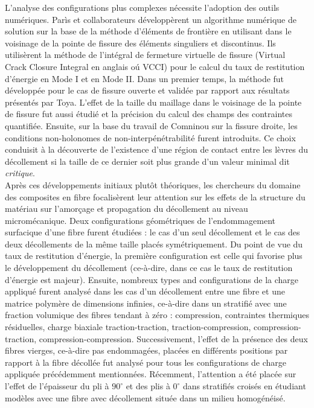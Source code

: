 L'analyse des configurations plus complexes n\'ecessite l'adoption des outils num\'eriques. Par\`is et collaborateurs d\'evelopp\`erent un algorithme num\'erique de solution sur la base de la m\'ethode d'\'el\'ements de fronti\`ere en utilisant dans le voisinage de la pointe de fissure des \'el\'ements singuliers et discontinus. Ils utilis\`erent la m\'ethode de l'int\'egral de fermeture virtuelle de fissure (Virtual Crack Closure Integral en anglais o\'u VCCI) pour le calcul du taux de restitution d'\'energie en Mode I et en Mode II. Dans un premier temps, la m\'ethode fut d\'evelopp\'ee pour le cas de fissure ouverte et valid\'ee par rapport aux r\'esultats pr\'esent\'es par Toya. L'effet de la taille du maillage dans le voisinage de la pointe de fissure fut aussi \'etudi\'e et la pr\'ecision du calcul des champs des contraintes quantifi\'ee. Ensuite, sur la base du travail de Comninou sur la fissure droite, les conditions non-holonomes de non-interp\'en\'etrabilit\'e furent introduits. Ce choix conduisit \`a la d\'ecouverte de l'existence d'une r\'egion de contact entre les l\`evres du d\'ecollement si la taille de ce dernier soit plus grande d'un valeur minimal dit \textit{critique}.\\

Apr\`es ces d\'eveloppements initiaux plut\^ot th\'eoriques, les chercheurs du domaine des composites en fibre focalis\`erent leur attention sur les effets de la structure du mat\'eriau sur l'amor\c{c}age et propagation du d\'ecollement au niveau microm\'ecanique. Deux configurations g\'eom\'etriques de l'endommagement surfacique d'une fibre furent \'etudi\'ees : le cas d'un seul d\'ecollement et le cas des deux d\'ecollements de la m\^eme taille plac\'es sym\'etriquement. Du point de vue du taux de restitution d'\'energie, la premi\`ere configuration est celle qui favorise plus le d\'eveloppement du d\'ecollement (ce-\`a-dire, dans ce cas le taux de restitution d'\'energie est majeur). Ensuite, nombreux types and configurations de la charge appliqu\'e furent analys\'e dans les cas d'un d\'ecollement entre une fibre et une matrice polym\`ere de dimensions infinies, ce-\`a-dire dans un stratifi\'e avec une fraction volumique des fibres tendant \`a z\'ero : compression, contraintes thermiques r\'esiduelles, charge biaxiale traction-traction, traction-compression, compression-traction, compression-compression. Successivement, l'effet de la pr\'esence des deux fibres vierges, ce-\`a-dire pas endommag\'ees, plac\'ees en diff\'erents positions par rapport \`a la fibre d\'ecoll\'ee fut analys\'e pour tous les configurations de charge appliqu\'ee pr\'ec\'edemment mentionn\'ees. R\'ecemment, l'attention a \'et\'e plac\'ee sur l'effet de l'\'epaisseur du pli \`a $90^{\circ}$ et des plis \`a $0^{\circ}$ dans stratifi\'es crois\'es en \'etudiant mod\`eles avec une fibre avec d\'ecollement situ\'ee dans un milieu homog\'en\'eis\'e.\\

